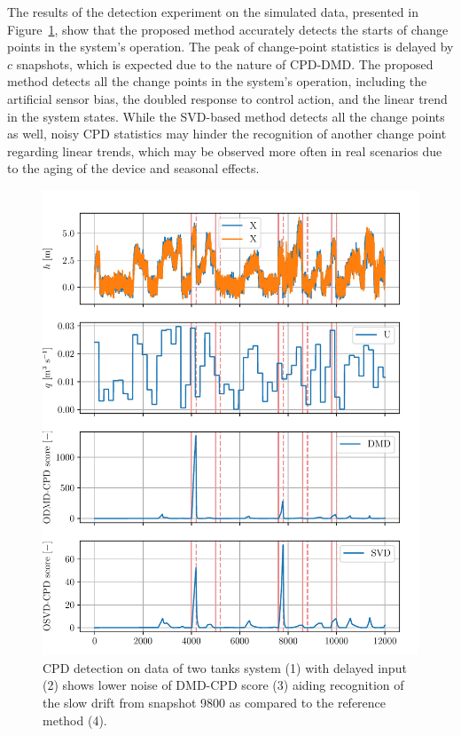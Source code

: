 The results of the detection experiment on the simulated data, presented in Figure~\ref{fig: non-linear}, show that the proposed method accurately detects the starts of change points in the system's operation. The peak of change-point statistics is delayed by \(c\) snapshots, which is expected due to the nature of CPD-DMD. The proposed method detects all the change points in the system's operation, including the artificial sensor bias, the doubled response to control action, and the linear trend in the system states. While the SVD-based method detects all the change points as well, noisy CPD statistics may hinder the recognition of another change point regarding linear trends, which may be observed more often in real scenarios due to the aging of the device and seasonal effects.

\begin{figure}[H]
	\centering
	\includegraphics[width=\linewidth]{figures/nonlin-chd_p2_q1-l2000_b200_t200roll_2000-dmd_w1.0-hx15-hl30.pdf}
	\caption{CPD detection on data of two tanks system (1) with delayed input (2) shows lower noise of DMD-CPD score (3) aiding recognition of the slow drift from snapshot 9800 as compared to the reference method (4).}\label{fig: non-linear}
\end{figure}

